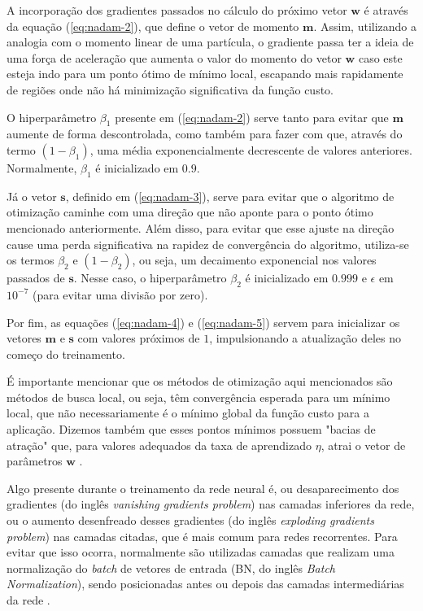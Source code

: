 \documentclass[a4paper, 12pt]{article}
\begin{document}
A incorporação dos gradientes passados no cálculo do próximo vetor $\mathbf{w}$ é através da equação (\ref{eq:nadam-2}), que define o vetor de momento $\mathbf{m}$. Assim, utilizando a analogia com o momento linear de uma partícula, o gradiente passa ter a ideia de uma força de aceleração que aumenta o valor do momento do vetor $\mathbf{w}$ caso este esteja indo para um ponto ótimo de mínimo local, escapando mais rapidamente de regiões onde não há minimização significativa da função custo.

O hiperparâmetro $\beta_1$ presente em (\ref{eq:nadam-2}) serve tanto para evitar que $\mathbf{m}$ aumente de forma descontrolada, como também para fazer com que, através do termo $(1 - \beta_1)$, uma média exponencialmente decrescente de valores anteriores. Normalmente, $\beta_1$ é inicializado em $0.9$.

Já o vetor $\mathbf{s}$, definido em (\ref{eq:nadam-3}), serve para evitar que o algoritmo de otimização caminhe com uma direção que não aponte para o ponto ótimo mencionado anteriormente. Além disso, para evitar que esse ajuste na direção cause uma perda significativa na rapidez de convergência do algoritmo, utiliza-se os termos $\beta_2$ e $(1 - \beta_2)$, ou seja, um decaimento exponencial nos valores passados de $\mathbf{s}$. Nesse caso, o hiperparâmetro $\beta_2$ é inicializado em $0.999$ e $\epsilon$ em $10^{-7}$ (para evitar uma divisão por zero).

Por fim, as equações (\ref{eq:nadam-4}) e (\ref{eq:nadam-5}) servem para inicializar os vetores $\mathbf{m}$ e $\mathbf{s}$ com valores próximos de $1$, impulsionando a atualização deles no começo do treinamento.

É importante mencionar que os métodos de otimização aqui mencionados são métodos de busca local, ou seja, têm convergência esperada para um mínimo local, que não necessariamente é o mínimo global da função custo para a aplicação. Dizemos também que esses pontos mínimos possuem "bacias de atração" que, para valores adequados da taxa de aprendizado $\eta$, atrai o vetor de parâmetros $\mathbf{w}$ \cite{hastie2009elements}.

Algo presente durante o treinamento da rede neural é, ou desaparecimento dos gradientes (do inglês \textit{vanishing gradients problem}) nas camadas inferiores da rede, ou o aumento desenfreado desses gradientes (do inglês \textit{exploding gradients problem}) nas camadas citadas, que é mais comum para redes recorrentes. Para evitar que isso ocorra, normalmente são utilizadas camadas que realizam uma normalização do \textit{batch} de vetores de entrada (BN, do inglês \textit{Batch Normalization}), sendo posicionadas antes ou depois das camadas intermediárias da rede \cite{geron2019hands}.
\end{document}
